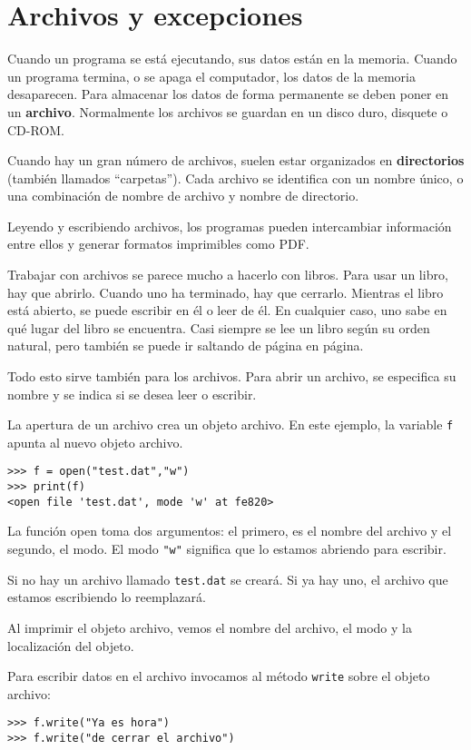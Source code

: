 
\chapter{Archivos y excepciones}


Cuando un programa se está ejecutando, sus datos están en la memoria.
Cuando un programa termina, o se apaga el computador, los datos de
la memoria desaparecen. Para almacenar los datos de forma permanente
se deben poner en un \textbf{archivo}. Normalmente los archivos se
guardan en un disco duro, disquete o CD-ROM.

Cuando hay un gran número de archivos, suelen estar organizados en
\textbf{directorios} (también llamados ``carpetas''). Cada archivo
se identifica con un nombre único, o una combinación de nombre de
archivo y nombre de directorio.

Leyendo y escribiendo archivos, los programas pueden intercambiar
información entre ellos y generar formatos imprimibles como PDF.

Trabajar con archivos se parece mucho a hacerlo con libros. Para usar
un libro, hay que abrirlo. Cuando uno ha terminado, hay que cerrarlo.
Mientras el libro está abierto, se puede escribir en él o leer de
él. En cualquier caso, uno sabe en qué lugar del libro se encuentra.
Casi siempre se lee un libro según su orden natural, pero también
se puede ir saltando de página en página.

Todo esto sirve también para los archivos. Para abrir un archivo,
se especifica su nombre y se indica si se desea leer o escribir.

La apertura de un archivo crea un objeto archivo. En este ejemplo,
la variable \texttt{f} apunta al nuevo objeto archivo.
\begin{lstlisting}
>>> f = open("test.dat","w")
>>> print(f)
<open file 'test.dat', mode 'w' at fe820>
\end{lstlisting}

La función open toma dos argumentos: el primero, es el nombre del
archivo y el segundo, el modo. El modo {\verb+"w"+} significa que
lo estamos abriendo para escribir.

Si no hay un archivo llamado \texttt{test.dat} se creará. Si ya hay
uno, el archivo que estamos escribiendo lo reemplazará.

Al imprimir el objeto archivo, vemos el nombre del archivo, el modo
y la localización del objeto.

Para escribir datos en el archivo invocamos al método \texttt{write}
sobre el objeto archivo:
\begin{lstlisting}
>>> f.write("Ya es hora")
>>> f.write("de cerrar el archivo")
\end{lstlisting}

